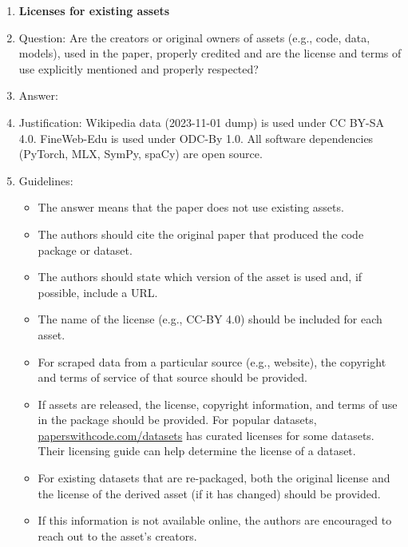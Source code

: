 \documentclass{article}
\begin{document}
\begin{enumerate}
\item {\bf Licenses for existing assets}
    \item[] Question: Are the creators or original owners of assets (e.g., code, data, models), used in the paper, properly credited and are the license and terms of use explicitly mentioned and properly respected?
    \item[] Answer: \answerYes{}
    \item[] Justification: Wikipedia data (2023-11-01 dump) is used under CC BY-SA 4.0. FineWeb-Edu \citep{penedo2024fineweb} is used under ODC-By 1.0. All software dependencies (PyTorch, MLX, SymPy, spaCy) are open source.
    \item[] Guidelines:
    \begin{itemize}
        \item The answer \answerNA{} means that the paper does not use existing assets.
        \item The authors should cite the original paper that produced the code package or dataset.
        \item The authors should state which version of the asset is used and, if possible, include a URL.
        \item The name of the license (e.g., CC-BY 4.0) should be included for each asset.
        \item For scraped data from a particular source (e.g., website), the copyright and terms of service of that source should be provided.
        \item If assets are released, the license, copyright information, and terms of use in the package should be provided. For popular datasets, \url{paperswithcode.com/datasets} has curated licenses for some datasets. Their licensing guide can help determine the license of a dataset.
        \item For existing datasets that are re-packaged, both the original license and the license of the derived asset (if it has changed) should be provided.
        \item If this information is not available online, the authors are encouraged to reach out to the asset's creators.
    \end{itemize}


\end{enumerate}
\end{document}
